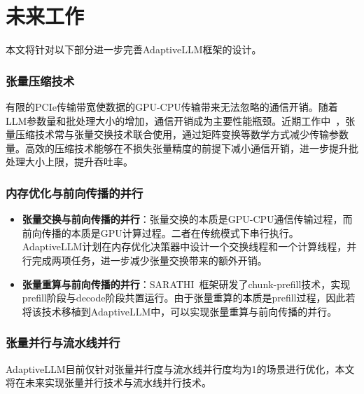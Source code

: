 \section{未来工作}

本文将针对以下部分进一步完善AdaptiveLLM框架的设计。

\subsubsection{张量压缩技术}

有限的PCIe传输带宽使数据的GPU-CPU传输带来无法忽略的通信开销。随着LLM参数量和批处理大小的增加，通信开销成为主要性能瓶颈。近期工作中~\cite{Swapping}，张量压缩技术常与张量交换技术联合使用，通过矩阵变换等数学方式减少传输参数量。高效的压缩技术能够在不损失张量精度的前提下减小通信开销，进一步提升批处理大小上限，提升吞吐率。

\subsubsection{内存优化与前向传播的并行}

\begin{itemize}

  \item \textbf{张量交换与前向传播的并行}：张量交换的本质是GPU-CPU通信传输过程，而前向传播的本质是GPU计算过程。二者在传统模式下串行执行。AdaptiveLLM计划在内存优化决策器中设计一个交换线程和一个计算线程，并行完成两项任务，进一步减少张量交换带来的额外开销。

  \item \textbf{张量重算与前向传播的并行}：SARATHI~\cite{SARATHI}框架研发了chunk-prefill技术，实现prefill阶段与decode阶段共置运行。由于张量重算的本质是prefill过程，因此若将该技术移植到AdaptiveLLM中，可以实现张量重算与前向传播的并行。

\end{itemize}

\subsubsection{张量并行与流水线并行~\cite{Parallelism}} AdaptiveLLM目前仅针对张量并行度与流水线并行度均为1的场景进行优化，本文将在未来实现张量并行技术与流水线并行技术。